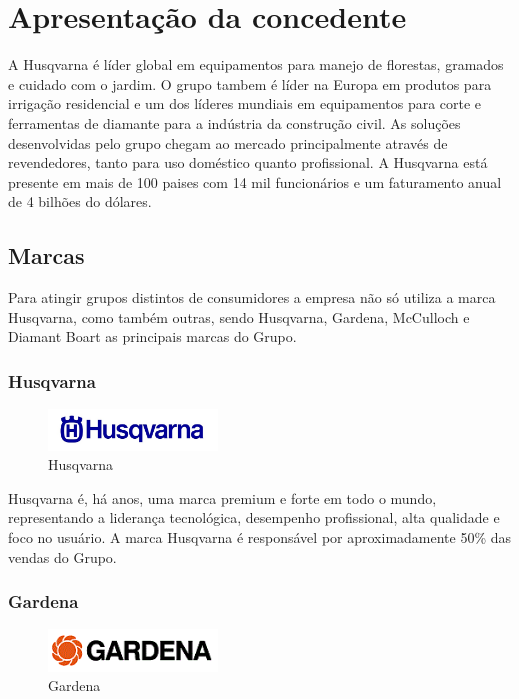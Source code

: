 \documentclass[12pt]{article}
\begin{document}
\section{Apresentação da concedente}

A Husqvarna é líder global em equipamentos para manejo de florestas, gramados e cuidado com o jardim. O grupo tambem é líder na Europa em produtos para irrigação residencial e um dos líderes mundiais em equipamentos para corte e ferramentas de diamante para a indústria da construção civil. As soluções desenvolvidas pelo grupo chegam ao mercado principalmente através de revendedores, tanto para uso doméstico quanto profissional. A Husqvarna está presente em mais de 100 paises com 14 mil funcionários e um faturamento anual de 4 bilhões do dólares.

\subsection{Marcas}
	Para atingir grupos distintos de consumidores a empresa não só utiliza a marca Husqvarna, como também outras, sendo Husqvarna, Gardena, McCulloch e Diamant Boart as principais marcas do Grupo.

\subsubsection{Husqvarna}

\begin{figure}[h!]
	\centering
	\includegraphics[width=0.4\textwidth]{img/logo-husqvarna.png}
	\caption{Husqvarna}
\end{figure}

	Husqvarna é, há anos, uma marca premium e forte em todo o mundo, representando a liderança tecnológica, desempenho profissional, alta qualidade e foco no usuário. A marca Husqvarna é responsável por aproximadamente 50\% das vendas do Grupo.

\subsubsection{Gardena}

\begin{figure}[h!]
	\centering
	\includegraphics[width=0.4\textwidth]{img/logo-gardena.png}
	\caption{Gardena}
\end{figure}
\end{document}
